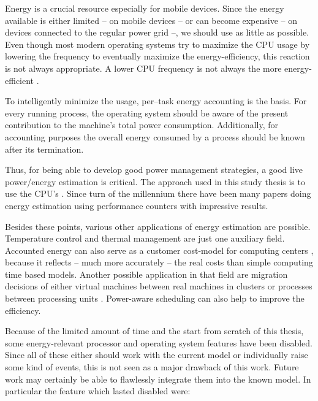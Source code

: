 
Energy is a crucial resource especially for mobile devices. Since the energy
available is either limited -- on mobile devices -- or can become expensive --
on devices connected to the regular power grid --, we should use as little as
possible. Even though most modern operating systems try to maximize the CPU
usage by lowering the frequency \cite{snowdon2010operating} to eventually
maximize the energy-efficiency, this reaction is not always appropriate. A lower
CPU frequency is not always the more energy-efficient
\cite{weissel2002process,snowdon2010operating}.

To intelligently minimize the usage, per--task energy accounting is the basis.
For every running process, the operating system should be aware of the present
contribution to the machine's total power consumption. Additionally, for
accounting purposes the overall energy consumed by a process should be known
after its termination.

Thus, for being able to develop good power management strategies, a good live
power/energy estimation is critical. The approach used in this study thesis is
to use the CPU's . Since turn of the
millennium \cite{bellosa2000benefits} there have been many papers
\cite{Bertran2010,bertran2010decomposable,kellner03tempcontrol,isci2003runtime,
weissel2002process} doing energy estimation using performance counters with
impressive results.

Besides these points, various other applications of energy estimation are
possible. Temperature control \cite{kellner03tempcontrol} and thermal management
\cite{merkel05tmsmpsys} are just one auxiliary field. Accounted energy can also
serve as a customer cost-model for computing centers \cite{Bertran2010}, because
it reflects -- much more accurately -- the real costs than simple computing time
based models. Another possible application in that field are migration decisions
of either virtual machines between real machines in clusters or processes
between processing units \cite{merkel10rcscheduling}. Power-aware scheduling can
also help to improve the efficiency.


\label{sec:restrictions}

Because of the limited amount of time and the start from scratch of this thesis,
some energy-relevant processor and operating system features have been disabled.
Since all of these either should work with the current model or individually
raise some kind of events, this is not seen as a major drawback of this work.
Future work may certainly be able to flawlessly integrate them into the known
model. In particular the feature which lasted disabled were:

